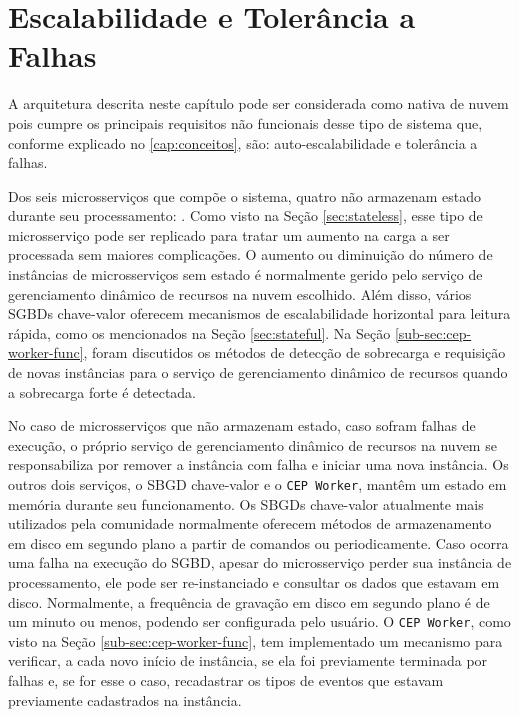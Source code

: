 

\section{Escalabilidade e Tolerância a Falhas}

A arquitetura descrita neste capítulo pode ser considerada como nativa de nuvem pois cumpre os principais requisitos não funcionais desse tipo de sistema que, conforme explicado no \ref{cap:conceitos}, são: auto-escalabilidade e tolerância a falhas.


Dos seis microsserviços que compõe o sistema, quatro não armazenam estado durante seu processamento: . Como visto na Seção \ref{sec:stateless}, esse tipo de microsserviço pode ser replicado para tratar um aumento na carga a ser processada sem maiores complicações. O aumento ou diminuição do número de instâncias de microsserviços sem estado é normalmente gerido pelo serviço de gerenciamento dinâmico de recursos na nuvem escolhido. Além disso, vários SGBDs chave-valor oferecem mecanismos de escalabilidade horizontal para leitura rápida, como os mencionados na Seção \ref{sec:stateful}. Na Seção \ref{sub-sec:cep-worker-func}, foram discutidos os métodos de detecção de sobrecarga e requisição de novas instâncias para o serviço de gerenciamento dinâmico de recursos quando a sobrecarga forte é detectada. 


No caso de microsserviços que não armazenam estado, caso sofram falhas de execução, o próprio serviço de gerenciamento dinâmico de recursos na nuvem se responsabiliza por remover a instância com falha e iniciar uma nova instância. Os outros dois serviços, o SBGD chave-valor e o \texttt{CEP Worker}, mantêm um estado em memória durante seu funcionamento. Os SBGDs chave-valor atualmente mais utilizados pela comunidade normalmente oferecem métodos de armazenamento em disco em segundo plano a partir de comandos ou periodicamente. Caso ocorra uma falha na execução do SGBD, apesar do microsserviço perder sua instância de processamento, ele pode ser re-instanciado e consultar os dados que estavam em disco. Normalmente, a frequência de gravação em disco em segundo plano é de um minuto ou menos, podendo ser configurada pelo usuário. O \texttt{CEP Worker}, como visto na Seção \ref{sub-sec:cep-worker-func}, tem implementado um mecanismo para verificar, a cada novo início de instância, se ela foi previamente terminada por falhas e, se for esse o caso, recadastrar os tipos de eventos que estavam previamente cadastrados na instância.

